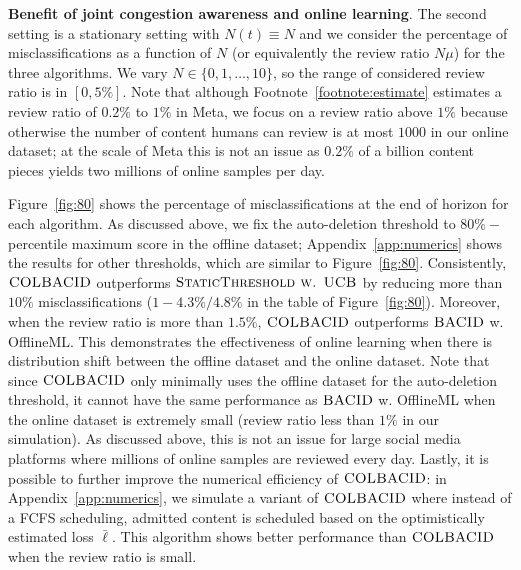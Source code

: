\noindent
\textbf{Benefit of joint congestion awareness and online learning}. The second setting is a stationary setting with $N(t) \equiv N$ and we consider the percentage of misclassifications as a function of $N$ (or equivalently the review ratio $N\mu$) for the three algorithms. We vary $N \in \{0,1,\ldots,10\}$, so the range of considered review ratio is in $[0,5\%]$. Note that although Footnote~\ref{footnote:estimate} estimates a review ratio of $0.2\%$ to $1\%$ in Meta, we focus on a review ratio above $1\%$ because otherwise the number of content humans can review is at most $1000$ in our online dataset; at the scale of Meta this is not an issue as $0.2\%$ of a billion content pieces yields two millions of online samples per day.

Figure~\ref{fig:80} shows the percentage of misclassifications at the end of horizon for each algorithm. As discussed above, we fix the auto-deletion threshold to $80\%-$percentile maximum score in the offline dataset; Appendix~\ref{app:numerics} shows the results for other thresholds, which are similar to Figure~\ref{fig:80}. Consistently, $\textsc{COLBACID}$ outperforms $\textsc{StaticThreshold w. UCB}$ by reducing more than $10\%$ misclassifications ($1 - 4.3\% / 4.8\%$ in the table of Figure~\ref{fig:80}). Moreover, when the review ratio is more than $1.5\%$, $\textsc{COLBACID}$ outperforms $\textsc{BACID}$ w. OfflineML. This demonstrates the effectiveness of online learning when there is distribution shift between the offline dataset and the online dataset. Note that since $\textsc{COLBACID}$ only minimally uses the offline dataset for the auto-deletion threshold, it cannot have the same performance as $\textsc{BACID}$ w. OfflineML when the online dataset is extremely small (review ratio less than $1\%$ in our simulation). As discussed above, this is not an issue for large social media platforms where millions of online samples are reviewed every day. Lastly, it is possible to further improve the numerical efficiency of $\textsc{COLBACID}$: in Appendix~\ref{app:numerics}, we simulate a variant of $\textsc{COLBACID}$ where instead of a FCFS scheduling, admitted content is scheduled based on the optimistically estimated loss $\bar{\ell}$. This algorithm shows better performance than $\textsc{COLBACID}$ when the review ratio is small.

